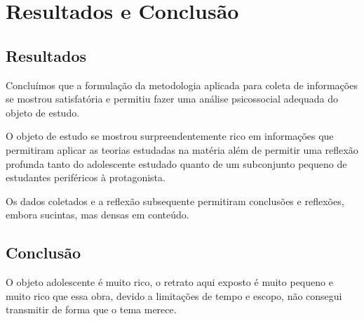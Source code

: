 \chapter{Resultados e Conclusão}

\section{Resultados}

Concluímos que a formulação da metodologia aplicada para coleta de informações se mostrou satisfatória e permitiu fazer uma análise psicossocial adequada do objeto de estudo.

O objeto de estudo se mostrou surpreendentemente rico em informações que permitiram aplicar as teorias estudadas na matéria além de permitir uma reflexão profunda tanto do adolescente estudado quanto de um subconjunto pequeno de estudantes periféricos à protagonista.

Os dados coletados e a reflexão subsequente permitiram conclusões e reflexões, embora sucintas, mas densas em conteúdo.

\section{Conclusão}

O objeto adolescente é muito rico, o retrato aqui exposto é muito pequeno e muito rico que essa obra, devido a limitações de tempo e escopo, não consegui transmitir de forma que o tema merece.

